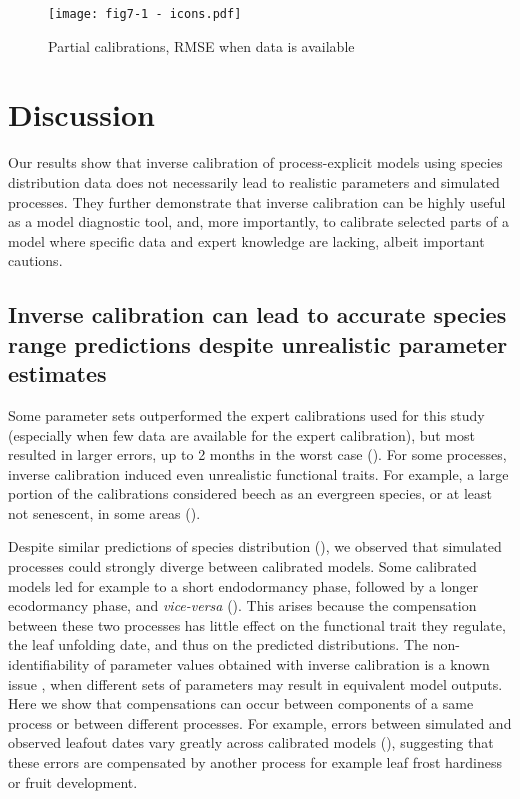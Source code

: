 \documentclass[letterpaper,8pt]{extarticle}  %
\begin{document}
\begin{doublespacing}
\begin{linenumbers}
\begin{figure}[htpb]
\hspace*{-1cm}
\centering
\begin{subcaptiongroup}
\label{fig:5A} 
\label{fig:5B}
\label{fig:5C}
\end{subcaptiongroup}
\texttt{[image: fig7-1 - icons.pdf]}
\caption{Partial calibrations, RMSE when data is available}
\label{fig:5}
\end{figure}


\section{Discussion}

Our results show that inverse calibration of process-explicit models using species distribution data does not necessarily lead to realistic parameters and simulated processes. They further demonstrate that inverse calibration can be highly useful as a model diagnostic tool, and, more importantly, to calibrate selected parts of a model where specific data and expert knowledge are lacking, albeit important cautions.

\subsection{Inverse calibration can lead to accurate species range predictions despite unrealistic parameter estimates}

Some parameter sets outperformed the expert calibrations used for this study (especially when few data are available for the expert calibration), but most resulted in larger errors, up to 2 months in the worst case (). For some processes, inverse calibration induced even unrealistic functional traits. For example, a large portion of the calibrations considered beech as an evergreen species, or at least not senescent, in some areas ().

Despite similar predictions of species distribution (), we observed that simulated processes could strongly diverge between calibrated models. Some calibrated models led for example to a short endodormancy phase, followed by a longer ecodormancy phase, and \textit{vice-versa} (). This arises because the compensation between these two processes has little effect on the functional trait they regulate, the leaf unfolding date, and thus on the predicted distributions. The non-identifiability of parameter values obtained with inverse calibration is a known issue \citep{He2017, Cameron2022, VanderMeersch2023}, when different sets of parameters may result in equivalent model outputs. Here we show that compensations can occur between components of a same process or between different processes. For example, errors between simulated and observed leafout dates vary greatly across calibrated models (), suggesting that these errors are compensated by another process for example leaf frost hardiness or fruit development. 


\end{linenumbers}
\end{doublespacing}
\end{document}

